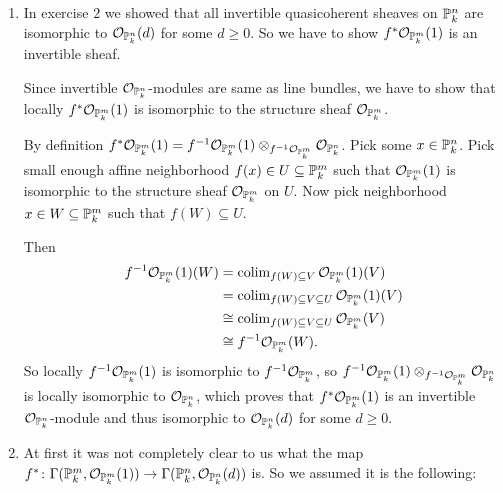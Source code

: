 \begin{exercise}{3}
    \begin{enumerate}
        \item{In exercise $2$ we showed that all invertible quasicoherent
            sheaves on $\mathbb{P}^n_k$ are isomorphic to
            $\mathcal{O}_{\mathbb{P}^n_k}(d)$ for some $d \geq 0$. So we have to show
            $f^* \mathcal{O}_{\mathbb{P}^m_k}(1)$ is an invertible sheaf.

            Since invertible $\mathcal{O}_{\mathbb{P}^n_k}$-modules are same as line
            bundles, we have to show that locally $f^*
            \mathcal{O}_{\mathbb{P}^m_k}(1)$ is isomorphic to the structure sheaf
            $\mathcal{O}_{\mathbb{P}^m_k}$.

            By definition $f^* \mathcal{O}_{\mathbb{P}^m_k}(1) = f^{-1}
            \mathcal{O}_{\mathbb{P}^m_k}(1) \otimes_{f^{-1} \mathcal{O}_{\mathbb{P}^m_k}}
            \mathcal{O}_{\mathbb{P}^n_k}$. Pick some $x \in \mathbb{P}^n_k$. Pick small
            enough affine neighborhood $f(x) \in U \subseteq \mathbb{P}^m_k$ such that
            $\mathcal{O}_{\mathbb{P}^m_k} (1)$ is isomorphic to the structure sheaf
            $\mathcal{O}_{\mathbb{P}^m_k}$ on $U$. Now pick neighborhood $x \in W \subseteq \mathbb{P}^m_k$
            such that $f(W) \subseteq U$.

            Then 
            \begin{align*}
                f^{-1} \mathcal{O}_{\mathbb{P}^m_k}(1) (W) &= \operatorname{colim}_{f(W) \subseteq
                V} \mathcal{O}_{\mathbb{P}^m_k} (1) (V) \\
                &= \operatorname{colim}_{f(W) \subseteq V \subseteq U} \mathcal{O}_{\mathbb{P}^m_k}
                (1) (V) \\
                &\cong \operatorname{colim}_{f(W) \subseteq V \subseteq U} \mathcal{O}_{\mathbb{P}^m_k}
                (V) \\
                &\cong f^{-1} \mathcal{O}_{\mathbb{P}^m_k} (W).
            \end{align*}
            So locally $f^{-1} \mathcal{O}_{\mathbb{P}^m_k}(1)$ is isomorphic to
            $f^{-1} \mathcal{O}_{\mathbb{P}^m_k}$, so $f^{-1}
            \mathcal{O}_{\mathbb{P}^m_k}(1) \otimes_{f^{-1} \mathcal{O}_{\mathbb{P}^m_k}}
            \mathcal{O}_{\mathbb{P}^n_k}$ is locally isomorphic to
            $\mathcal{O}_{\mathbb{P}^n_k}$, which proves that $f^*
            \mathcal{O}_{\mathbb{P}^m_k}(1)$ is an invertible
            $\mathcal{O}_{\mathbb{P}^n_k}$-module and thus isomorphic to
            $\mathcal{O}_{\mathbb{P}^n_k}(d)$ for some $d \geq 0$.
            }
        \item{
                At first it was not completely clear to us what the map $f^*
                \colon \Gamma(\mathbb{P}^m_k, \mathcal{O}_{\mathbb{P}^m_k}(1)) \to
                \Gamma(\mathbb{P}^n_k, \mathcal{O}_{\mathbb{P}^n_k} (d))$ is.
                So we assumed it is the following:

}
\end{enumerate}
\end{exercise}
